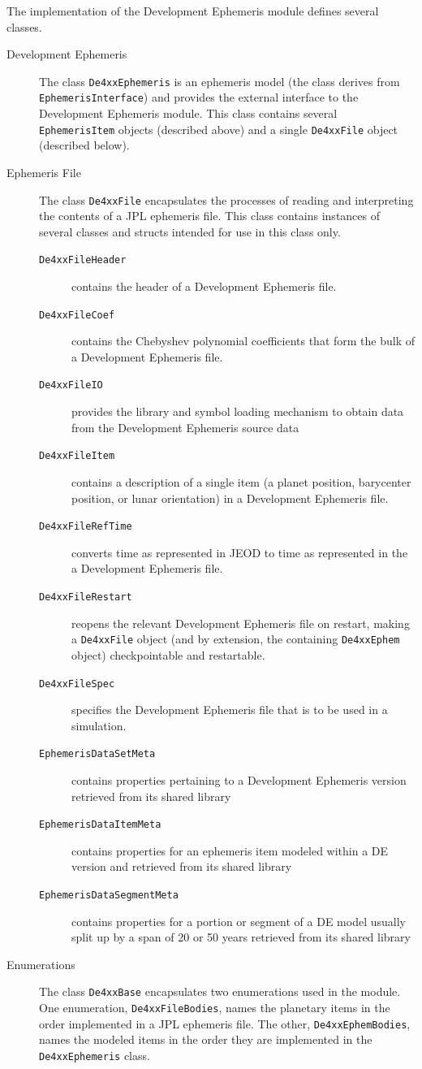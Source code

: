 The implementation of the Development Ephemeris module defines several classes.\begin{description}
\item[Development Ephemeris] The class \texttt{De4xxEphemeris} is an
ephemeris model (the class derives from \texttt{EphemerisInterface})
and provides the external interface to the Development Ephemeris module.
This class contains several \texttt{EphemerisItem} objects (described above)
and a single \texttt{De4xxFile} object (described below).

\item[Ephemeris File] The class \texttt{De4xxFile} encapsulates the processes
of reading and interpreting the contents of a JPL ephemeris file. This class
contains instances of several classes and structs intended for use in this 
class only.
\begin{description}
\item[\texttt{De4xxFileHeader}] contains the header of a
Development Ephemeris file.
\item[\texttt{De4xxFileCoef}] contains the Chebyshev polynomial coefficients
that form the bulk of a Development Ephemeris file.
\item[\texttt{De4xxFileIO}] provides the library and symbol loading
mechanism to obtain data from the Development Ephemeris source data 
\item[\texttt{De4xxFileItem}] contains a description of a single item
(a planet position, barycenter position, or lunar orientation) in a
Development Ephemeris file.
\item[\texttt{De4xxFileRefTime}] converts time as represented
in JEOD to time as represented in the a Development Ephemeris file.
\item[\texttt{De4xxFileRestart}] reopens the relevant Development Ephemeris file
on restart, making a \texttt{De4xxFile} object (and by extension, the
containing \texttt{De4xxEphem} object) checkpointable and restartable.
\item[\texttt{De4xxFileSpec}] specifies the Development Ephemeris file
that is to be used in a simulation.
\item[\texttt{EphemerisDataSetMeta}] contains properties pertaining to a 
Development Ephemeris version retrieved from its shared library
\item[\texttt{EphemerisDataItemMeta}] contains properties for an ephemeris item
modeled within a DE version and retrieved from its shared library
\item[\texttt{EphemerisDataSegmentMeta}] contains properties for a portion or 
segment of a DE model usually split up by a span of 20 or 50 years retrieved
from its shared library
\end{description}

\item[Enumerations] The class \texttt{De4xxBase} encapsulates two enumerations
used in the module. One enumeration, \texttt{De4xxFileBodies}, names the
planetary items in the order implemented in a JPL ephemeris file. The
other, \texttt{De4xxEphemBodies}, names the modeled items in the order
they are implemented in the \texttt{De4xxEphemeris} class.
\end{description}

